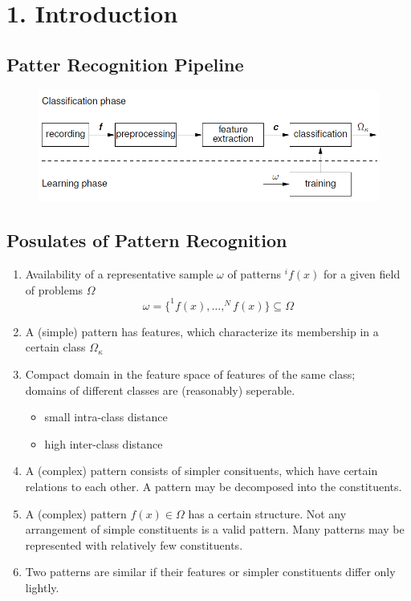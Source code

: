 \section*{1. Introduction}
\subsection*{Patter Recognition Pipeline}
\begin{figure}[H]
    \centering
    \includegraphics[scale=0.6]{figures/pipeline}
\end{figure}

\subsection*{Posulates of Pattern Recognition}
\begin{enumerate}
    \item
        Availability of a representative sample $\omega$ of patterns $^if(x)$ for a given field of problems $\Omega$
        $$\omega = \{^1f(x),\dots,^Nf(x)\}\subseteq \Omega$$
    \item
        A (simple) pattern has features, which characterize its membership in a certain class $\Omega_{\kappa}$
    \item
        Compact domain in the feature space of features of the same class;\\ 
        domains of different classes are (reasonably) seperable.
        \begin{itemize}
            \item
                small intra-class distance
            \item
                high inter-class distance
        \end{itemize}
    \item
        A (complex) pattern consists of simpler consituents, which have certain relations to each other. A pattern may be decomposed into the constituents.
    \item
        A (complex) pattern $f(x) \in \Omega$ has a certain structure. Not any arrangement of simple constituents is a valid pattern. Many patterns may be represented with relatively few constituents.
    \item
        Two patterns are similar if their features or simpler constituents differ only lightly.
\end{enumerate}

